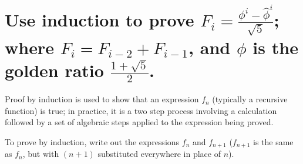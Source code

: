 \section[Problem 2]{Use induction to prove $F_i = \frac{\phi^i - \hat{\phi}^i}{\sqrt{5}}$; where $F_i = F_{i-2} + F_{i-1}$, and $\phi$ is the golden ratio $\frac{1 + \sqrt{5}}{2}$.}

Proof by induction is used to show that an expression $f_n$ (typically a recursive function) is true; in practice, it is a two step process involving a calculation followed by a set of algebraic steps applied to the expression being proved. 

To prove by induction, write out the expressions $f_n$ and $f_{n + 1}$ ($f_{n + 1}$ is the same as $f_n$, but with $(n + 1)$ substituted everywhere in place of $n$).
